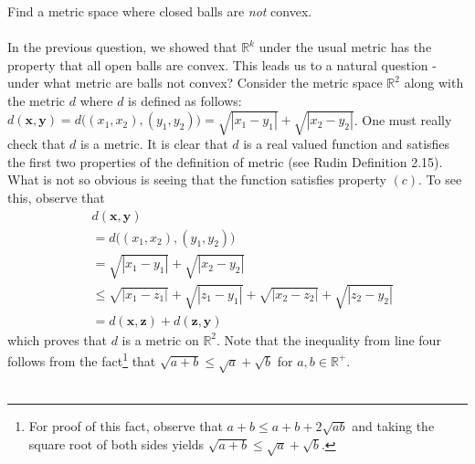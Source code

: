 \documentclass[12pt]{article}
\begin{document}
\problem Find a metric space where closed balls are \textsl{not} convex. \\ \\
In the previous question, we showed that $\mathbb{R}^{k}$ under the usual metric has the property that all open balls are convex. This leads us to a natural question - under what metric are balls not convex? Consider the metric space $\mathbb{R}^{2}$ along with the metric $d$ where $d$ is defined as follows: $d(\textbf{x}, \textbf{y})=d\big((x_{1},x_{2}),(y_{1},y_{2})\big) = \sqrt{|x_{1}-y_{1}|}+\sqrt{|x_{2}-y_{2}|}$. One must really check that $d$ is a metric. It is clear that $d$ is a real valued function and satisfies the first two properties of the definition of metric (see Rudin Definition 2.15). What is not so obvious is seeing that the function satisfies property $(c)$. To see this, observe that 
\begin{align*}
&   d(\textbf{x}, \textbf{y}) \\ 
& = d\big((x_{1},x_{2}),(y_{1},y_{2})\big)\\ 
& = \sqrt{|x_{1}-y_{1}|}+\sqrt{|x_{2}-y_{2}|} \\
& \leq  \sqrt{|x_{1}-z_{1}|}+\sqrt{|z_{1}-y_{1}|} + \sqrt{|x_{2}-z_{2}|}+\sqrt{|z_{2}-y_{2}|} \\ 
& = d(\textbf{x}, \textbf{z}) + d(\textbf{z}, \textbf{y})
\end{align*}  
which proves that $d$ is a metric on $\mathbb{R}^{2}$. Note that the inequality from line four follows from the fact{\footnote{For proof of this fact, observe that $a+b \leq a+b+2\sqrt{ab}$ and taking the square root of both sides yields $\sqrt{a+b} \leq \sqrt{a} + \sqrt{b}$.}} that $\sqrt{a+b} \leq \sqrt{a} + \sqrt{b}$ for $a, b \in \mathbb{R}^{+}$. \\ \\
\end{document}
